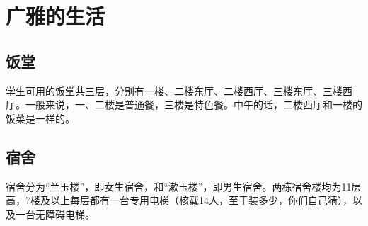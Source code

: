 \chapter{广雅的生活}
\label{chap:life}

  \section{饭堂}
    学生可用的饭堂共三层，分别有一楼、二楼东厅、二楼西厅、三楼东厅、三楼西厅。一般来说，一、二楼是普通餐，三楼是特色餐。中午的话，二楼西厅和一楼的饭菜是一样的。
  
  \section{宿舍}
    宿舍分为“兰玉楼”，即女生宿舍，和“漱玉楼”，即男生宿舍。两栋宿舍楼均为11层高，7楼及以上每层都有一台专用电梯（核载14人，至于装多少，你们自己猜），以及一台无障碍电梯。